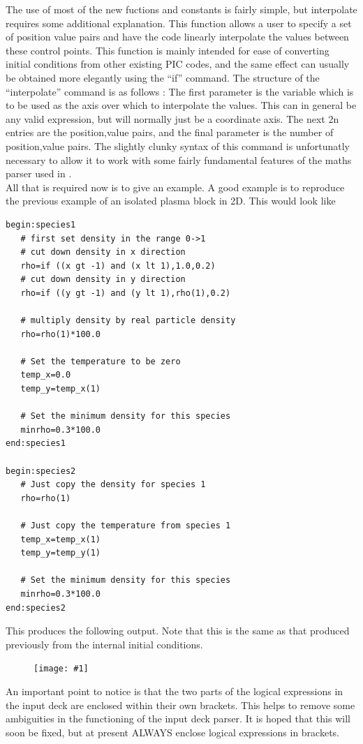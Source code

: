 \documentclass[12pt,a4paper]{article}
\newcommand{\simpleboxverbatim}{\begin{Verbatim}[obeytabs=true,frame=single,
  framerule=0.5mm,rulecolor=\color{warwickmid},formatcom=\color{black}]}
\newcommand{\EPOCH}{{\color{warwickdark}\fontfamily{phv}\selectfont{EPOCH}}}
\newcommand{\image}[1]
  {{\begin{figure}[hbt!]\centering\texttt{[image: \#1]}\end{figure}}}
\begin{document}
The use of most of the new fuctions and constants is fairly simple, but
interpolate requires some additional explanation. This function allows a user
to specify a set of position value pairs and have the code linearly
interpolate the values between these control points. This function is mainly
intended for ease of converting initial conditions from other existing PIC
codes, and the same effect can usually be obtained more elegantly using the
``if'' command. The structure of the ``interpolate'' command is as follows :
The first parameter is the variable which is to be used as the axis over which
to interpolate the values. This can in general be any valid expression, but
will normally just be a coordinate axis. The next 2n entries are the
position,value pairs, and the final parameter is the number of position,value
pairs. The slightly clunky syntax of this command is unfortunatly necessary to
allow it to work with some fairly fundamental features of the maths parser
used in \EPOCH.\\
All that is required now is to give an example. A good example is to reproduce
the previous example of an isolated plasma block in 2D. This would look like
\simpleboxverbatim
begin:species1
   # first set density in the range 0->1
   # cut down density in x direction
   rho=if ((x gt -1) and (x lt 1),1.0,0.2)
   # cut down density in y direction
   rho=if ((y gt -1) and (y lt 1),rho(1),0.2)

   # multiply density by real particle density
   rho=rho(1)*100.0

   # Set the temperature to be zero
   temp_x=0.0
   temp_y=temp_x(1)

   # Set the minimum density for this species
   minrho=0.3*100.0
end:species1

begin:species2
   # Just copy the density for species 1
   rho=rho(1)

   # Just copy the temperature from species 1
   temp_x=temp_x(1)
   temp_y=temp_y(1)

   # Set the minimum density for this species
   minrho=0.3*100.0
end:species2
\end{Verbatim}

This produces the following output. Note that this is the same as that
produced previously from the internal initial conditions.\\
\image{./images/example3}
An important point to notice is that the two parts of the logical expressions
in the input deck are enclosed within their own brackets. This helps to remove
some ambiguities in the functioning of the input deck parser. It is hoped that
this will soon be fixed, but at present ALWAYS enclose logical expressions in
brackets.
\end{document}
